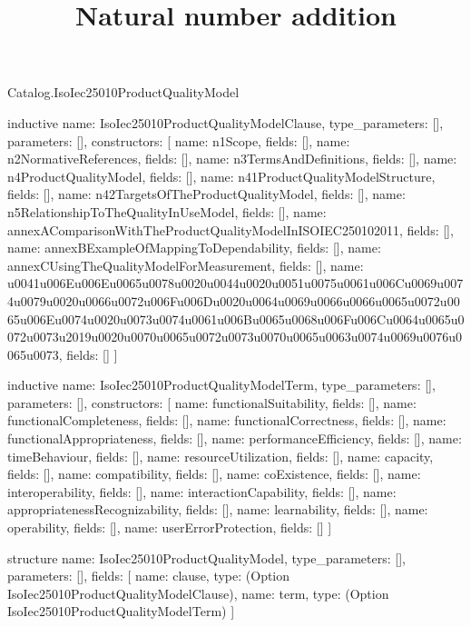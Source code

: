 \begin{lexlean}{Catalog.IsoIec25010ProductQualityModel}
\title{Natural number addition}
\begin{semanticmodule}
inductive{
  name: IsoIec25010ProductQualityModelClause,
  type_parameters: [],
  parameters: [],
  constructors: [
    {name: n1Scope, fields: []},
    {name: n2NormativeReferences, fields: []},
    {name: n3TermsAndDefinitions, fields: []},
    {name: n4ProductQualityModel, fields: []},
    {name: n41ProductQualityModelStructure, fields: []},
    {name: n42TargetsOfTheProductQualityModel, fields: []},
    {name: n5RelationshipToTheQualityInUseModel, fields: []},
    {name: annexAComparisonWithTheProductQualityModelInISOIEC250102011, fields: []},
    {name: annexBExampleOfMappingToDependability, fields: []},
    {name: annexCUsingTheQualityModelForMeasurement, fields: []},
    {name: u0041u006Eu006Eu0065u0078u0020u0044u0020u0051u0075u0061u006Cu0069u0074u0079u0020u0066u0072u006Fu006Du0020u0064u0069u0066u0066u0065u0072u0065u006Eu0074u0020u0073u0074u0061u006Bu0065u0068u006Fu006Cu0064u0065u0072u0073u2019u0020u0070u0065u0072u0073u0070u0065u0063u0074u0069u0076u0065u0073, fields: []}
  ]
}

inductive{
  name: IsoIec25010ProductQualityModelTerm,
  type_parameters: [],
  parameters: [],
  constructors: [
    {name: functionalSuitability, fields: []},
    {name: functionalCompleteness, fields: []},
    {name: functionalCorrectness, fields: []},
    {name: functionalAppropriateness, fields: []},
    {name: performanceEfficiency, fields: []},
    {name: timeBehaviour, fields: []},
    {name: resourceUtilization, fields: []},
    {name: capacity, fields: []},
    {name: compatibility, fields: []},
    {name: coExistence, fields: []},
    {name: interoperability, fields: []},
    {name: interactionCapability, fields: []},
    {name: appropriatenessRecognizability, fields: []},
    {name: learnability, fields: []},
    {name: operability, fields: []},
    {name: userErrorProtection, fields: []}
  ]
}

structure{
  name: IsoIec25010ProductQualityModel,
  type_parameters: [],
  parameters: [],
  fields: [
    {name: clause, type: (Option IsoIec25010ProductQualityModelClause)},
    {name: term, type: (Option IsoIec25010ProductQualityModelTerm)}
  ]
}
\end{semanticmodule}
\end{lexlean}
